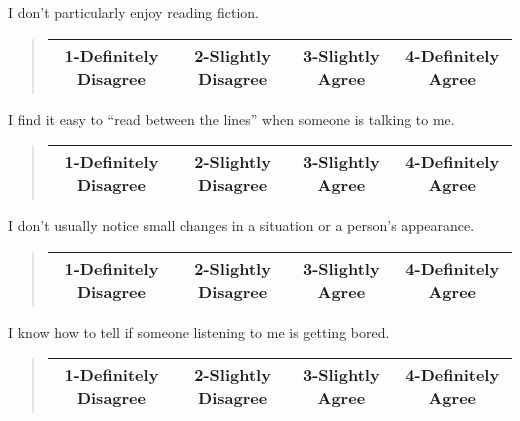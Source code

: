 \documentclass[11pt]{article}
\begin{document}
\begin{tcolorbox}
I don't particularly enjoy reading fiction.  \\
\begin{quote}
\begin{center}
	\begin{tabular}{|c|c|c|c|}
\hline
		1-Definitely Disagree & 2-Slightly Disagree & 3-Slightly Agree & 4-Definitely Agree\\ \hline
	\end{tabular}
\end{center}
\end{quote}
\end{tcolorbox}
\begin{tcolorbox}
I find it easy to ``read between the lines'' when someone is talking to me.  \\
\begin{quote}
\begin{center}
	\begin{tabular}{|c|c|c|c|}
\hline
		1-Definitely Disagree & 2-Slightly Disagree & 3-Slightly Agree & 4-Definitely Agree\\ \hline
	\end{tabular}
\end{center}
\end{quote}
\end{tcolorbox}
\begin{tcolorbox}
I don't usually notice small changes in a situation or a person's appearance. \\
\begin{quote}
\begin{center}
	\begin{tabular}{|c|c|c|c|}
\hline
		1-Definitely Disagree & 2-Slightly Disagree & 3-Slightly Agree & 4-Definitely Agree\\ \hline
	\end{tabular}
\end{center}
\end{quote} 
\end{tcolorbox}
\begin{tcolorbox}
I know how to tell if someone listening to me is getting bored.  \\
\begin{quote}
\begin{center}
	\begin{tabular}{|c|c|c|c|}
\hline
		1-Definitely Disagree & 2-Slightly Disagree & 3-Slightly Agree & 4-Definitely Agree\\ \hline
	\end{tabular}
\end{center}
\end{quote}
\end{tcolorbox}
\end{document}
